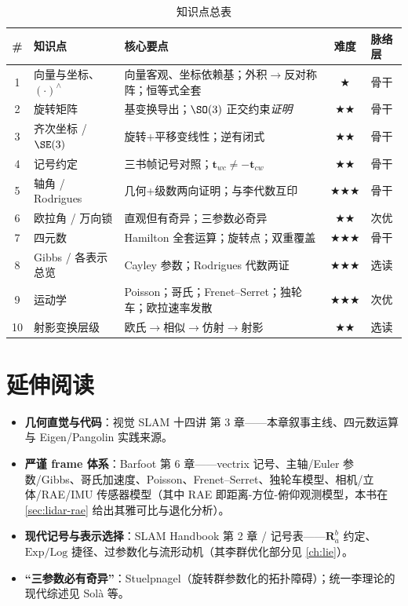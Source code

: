 \begin{table}[H]\centering\small
\caption{知识点总表}
\begin{tabular}{cllcl}
\toprule
\# & 知识点 & 核心要点 & 难度 & 脉络层 \\
\midrule
1 & 向量与坐标、$(\cdot)^\wedge$ & 向量客观、坐标依赖基；外积$\to$反对称阵；恒等式全套 & \(\bigstar\) & 骨干\\
2 & 旋转矩阵 & 基变换导出；$\SO(3)$ 正交约束\emph{证明} & \(\bigstar\bigstar\) & 骨干\\
3 & 齐次坐标 / $\SE(3)$ & 旋转+平移变线性；逆有闭式 & \(\bigstar\bigstar\) & 骨干\\
4 & 记号约定 & 三书帧记号对照；$\mathbf{t}_{wc}\neq-\mathbf{t}_{cw}$ & \(\bigstar\bigstar\) & 骨干\\
5 & 轴角 / Rodrigues & 几何+级数两向证明；与李代数互印 & \(\bigstar\bigstar\bigstar\) & 骨干\\
6 & 欧拉角 / 万向锁 & 直观但有奇异；三参数必奇异 & \(\bigstar\bigstar\) & 次优\\
7 & 四元数 & Hamilton 全套运算；旋转点；双重覆盖 & \(\bigstar\bigstar\bigstar\) & 骨干\\
8 & Gibbs / 各表示总览 & Cayley 参数；Rodrigues 代数两证 & \(\bigstar\bigstar\bigstar\) & 选读\\
9 & 运动学 & Poisson；哥氏；Frenet--Serret；独轮车；欧拉速率发散 & \(\bigstar\bigstar\bigstar\) & 次优\\
10 & 射影变换层级 & 欧氏$\to$相似$\to$仿射$\to$射影 & \(\bigstar\bigstar\) & 选读\\
\bottomrule
\end{tabular}
\end{table}

\section*{延伸阅读}
\begin{itemize}
  \item \textbf{几何直觉与代码}：视觉 SLAM 十四讲\cite{gaoxiang2019slam14} 第 3 章——本章叙事主线、四元数运算与 Eigen/Pangolin 实践来源。
  \item \textbf{严谨 frame 体系}：Barfoot\cite{barfoot2024state} 第 6 章——vectrix 记号、主轴/Euler 参数/Gibbs、哥氏加速度、Poisson、Frenet--Serret、独轮车模型、相机/立体/RAE/IMU 传感器模型（其中 RAE 即距离-方位-俯仰观测模型，本书在 \cref{sec:lidar-rae} 给出其雅可比与退化分析）。
  \item \textbf{现代记号与表示选择}：SLAM Handbook\cite{carlone2026handbook} 第 2 章 / 记号表——$\mathbf{R}_a^b$ 约定、$\mathrm{Exp}/\mathrm{Log}$ 捷径、过参数化与流形动机（其李群优化部分见 \cref{ch:lie}）。
  \item \textbf{“三参数必有奇异”}：Stuelpnagel\cite{stuelpnagel1964parametrization}（旋转群参数化的拓扑障碍）；统一李理论的现代综述见 Solà 等\cite{sola2018micro}。
\end{itemize}

